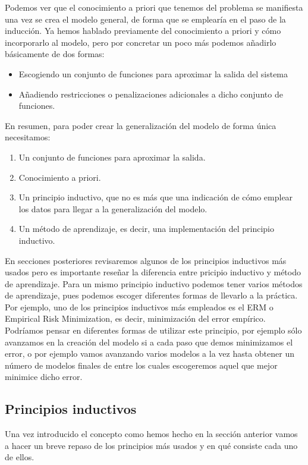 Podemos ver que el conocimiento a priori que tenemos del problema se manifiesta una vez se crea el modelo general, de forma que se emplearía en el paso de la inducción. Ya hemos hablado previamente del conocimiento a priori y cómo incorporarlo al modelo, pero por concretar un poco más podemos añadirlo básicamente de dos formas:

\begin{itemize}
	\item Escogiendo un conjunto de funciones para aproximar la salida del sistema
	\item Añadiendo restricciones o penalizaciones adicionales a dicho conjunto de funciones.
\end{itemize}

En resumen, para poder crear la generalización del modelo de forma única necesitamos:

\begin{enumerate}
	\item Un conjunto de funciones para aproximar la salida.
	\item Conocimiento a priori.
	\item Un principio inductivo, que no es más que una indicación de cómo emplear los datos para llegar a la generalización del modelo.
	\item Un método de aprendizaje, es decir, una implementación del principio inductivo.
\end{enumerate}

En secciones posteriores revisaremos algunos de los principios inductivos más usados pero es importante reseñar la diferencia entre pricipio inductivo y método de aprendizaje. Para un mismo principio inductivo podemos tener varios métodos de aprendizaje, pues podemos escoger diferentes formas de llevarlo a la práctica. Por ejemplo, uno de los principios inductivos más empleados es el ERM o Empirical Risk Minimization, es decir, minimización del error empírico. Podríamos pensar en diferentes formas de utilizar este principio, por ejemplo sólo avanzamos en la creación del modelo si a cada paso que demos minimizamos el error, o por ejemplo vamos avanzando varios modelos a la vez hasta obtener un número de modelos finales de entre los cuales escogeremos aquel que mejor minimice dicho error.

\subsection{Principios inductivos}

Una vez introducido el concepto como hemos hecho en la sección anterior vamos a hacer un breve repaso de los principios más usados y en qué consiste cada uno de ellos.

